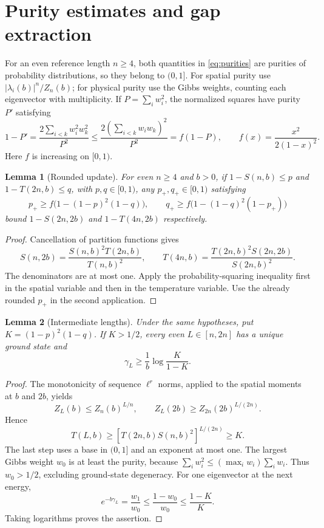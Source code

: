 \documentclass[11pt,a4paper]{article}
\newtheorem{lemma}{Lemma}
\newcommand{\gap}{\gamma}
\begin{document}
\section{Purity estimates and gap extraction}
For an even reference length $n\ge4$, both quantities in
\eqref{eq:purities} are purities of probability
distributions, so they belong to $(0,1]$. For spatial purity use
$|\lambda_i(b)|^n/Z_n(b)$; for physical purity use the Gibbs weights,
counting each eigenvector with multiplicity. If $P=\sum_i w_i^2$,
the normalized squares have purity $P'$ satisfying
\[
 1-P'=\frac{2\sum_{i<k}w_i^2w_k^2}{P^2}
 \le\frac{2(\sum_{i<k}w_iw_k)^2}{P^2}
 =f(1-P),\qquad f(x)=\frac{x^2}{2(1-x)^2}.
\]
Here $f$ is increasing on $[0,1)$.

\begin{lemma}[Rounded update]\label{lem:update}
For even $n\ge4$ and $b>0$, if $1-S(n,b)\le p$ and
$1-T(2n,b)\le q$, with $p,q\in[0,1)$,
any $p_+,q_+\in[0,1)$ satisfying
\begin{equation}\label{eq:update}
 p_+\ge f\bigl(1-(1-p)^2(1-q)\bigr),\qquad
 q_+\ge f\bigl(1-(1-q)^2(1-p_+)\bigr)
\end{equation}
bound $1-S(2n,2b)$ and $1-T(4n,2b)$ respectively.
\end{lemma}
\begin{proof}
Cancellation of partition functions gives
\[
 S(n,2b)=\frac{S(n,b)^2T(2n,b)}{T(n,b)^2},\qquad
 T(4n,b)=\frac{T(2n,b)^2S(2n,2b)}{S(2n,b)^2}.
\]
The denominators are at most one. Apply the probability-squaring
inequality first in the spatial variable and then in the temperature
variable. Use the already rounded $p_+$ in the second application.
\end{proof}

\begin{lemma}[Intermediate lengths]\label{lem:interval}
Under the same hypotheses, put $K=(1-p)^2(1-q)$.
If $K>1/2$, every even $L\in[n,2n]$ has a unique ground state and
\begin{equation}\label{eq:intervalgap}
 \gap_L\ge\frac1b\log\frac{K}{1-K}.
\end{equation}
\end{lemma}
\begin{proof}
The monotonicity of sequence $\ell^r$ norms, applied to the spatial
moments at $b$ and $2b$, yields
\[
 Z_L(b)\le Z_n(b)^{L/n},\qquad
 Z_L(2b)\ge Z_{2n}(2b)^{L/(2n)}.
\]
Hence
\[
 T(L,b)\ge[T(2n,b)S(n,b)^2]^{L/(2n)}\ge K.
\]
The last step uses a base in $(0,1]$ and an exponent at most one.
The largest Gibbs weight $w_0$ is at least the purity, because
$\sum_iw_i^2\le(\max_iw_i)\sum_iw_i$. Thus $w_0>1/2$, excluding
ground-state degeneracy. For one eigenvector at the next energy,
\[
 e^{-b\gap_L}=\frac{w_1}{w_0}\le\frac{1-w_0}{w_0}
 \le\frac{1-K}{K}.
\]
Taking logarithms proves the assertion.
\end{proof}
\end{document}
